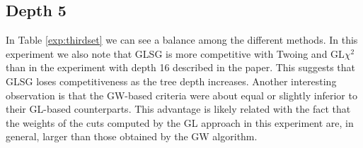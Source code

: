 \subsection{Depth 5}

In Table \ref{exp:thirdset} we can see a balance among the different methods.
In this experiment we also note that GLSG is more competitive with Twoing and GL$\chi^2$ than in the experiment with depth 16 described in the paper. This suggests that GLSG loses competitiveness as the tree depth increases.
Another interesting observation is that the GW-based criteria were about equal or slightly inferior to their GL-based counterparts.
This advantage is likely related with the fact that the weights of the cuts computed by the GL approach in this experiment are, in general, larger
than those obtained by the GW algorithm.


